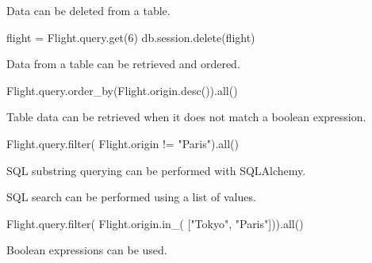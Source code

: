 \documentclass[]{book}
\newenvironment{Shaded}{\begin{snugshade}}{\end{snugshade}}
\newcommand{\ExtensionTok}[1]{#1}
\newcommand{\NormalTok}[1]{#1}
\newcommand{\StringTok}[1]{\textcolor[rgb]{0.31,0.60,0.02}{#1}}
\begin{document}
Data can be deleted from a table.

\begin{Shaded}
\begin{Highlighting}[]
\ExtensionTok{flight}\NormalTok{ = Flight.query.get(6)}
\ExtensionTok{db.session.delete}\NormalTok{(flight)}
\end{Highlighting}
\end{Shaded}

Data from a table can be retrieved and ordered.

\begin{Shaded}
\begin{Highlighting}[]
\ExtensionTok{Flight.query.order_by}\NormalTok{(Flight.origin.desc())}\ExtensionTok{.all}\NormalTok{()}
\end{Highlighting}
\end{Shaded}

Table data can be retrieved when it does not match a boolean expression.

\begin{Shaded}
\begin{Highlighting}[]
\ExtensionTok{Flight.query.filter}\NormalTok{(}
    \ExtensionTok{Flight.origin}\NormalTok{ != }\StringTok{"Paris"}\NormalTok{)}\ExtensionTok{.all}\NormalTok{()}
\end{Highlighting}
\end{Shaded}

SQL substring querying can be performed with SQLAlchemy.

\begin{Shaded}
\end{Shaded}

SQL search can be performed using a list of values.

\begin{Shaded}
\begin{Highlighting}[]
\ExtensionTok{Flight.query.filter}\NormalTok{(}
    \ExtensionTok{Flight.origin.in_}\NormalTok{(}
\NormalTok{        [}\StringTok{"Tokyo"}\NormalTok{, }\StringTok{"Paris"}\NormalTok{]))}\ExtensionTok{.all}\NormalTok{()}
\end{Highlighting}
\end{Shaded}

Boolean expressions can be used.
\end{document}
